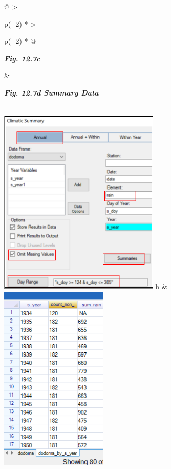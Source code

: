 \documentclass[
  letterpaper,
  DIV=11,
  numbers=noendperiod]{scrreprt}
\begin{document}
\begin{longtable}[]{@{}
  >{\raggedright\arraybackslash}p{(\columnwidth - 2\tabcolsep) * }
  >{\raggedright\arraybackslash}p{(\columnwidth - 2\tabcolsep) * }@{}}
\toprule\noalign{}
\begin{minipage}[b]{\linewidth}\raggedright
\textbf{\emph{Fig. 12.7c}}
\end{minipage} & \begin{minipage}[b]{\linewidth}\raggedright
\textbf{\emph{Fig. 12.7d Summary Data}}
\end{minipage} \\
\midrule\noalign{}
\endhead
\bottomrule\noalign{}
\endlastfoot
\includegraphics[width=3.02782in,height=3.53336in]{figures/Fig12.7c.png}
h &
\includegraphics[width=2.00847in,height=\textheight]{figures/Fig12.7d.png} \\
\end{longtable}
\end{document}
